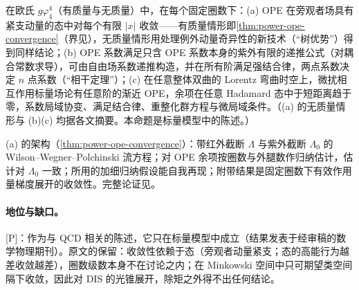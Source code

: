\begin{proposition}\label{prop:front-ope-scalar}
在欧氏 $g\varphi^4_4$（有质量与无质量）中，在每个固定圈数下：(a) OPE 在旁观者场具有紧支动量的态中对每个有限 $|x|$ 收敛——有质量情形即\cref{thm:power-ope-convergence}（界见\cite[式~(7)]{Hollands:2011gf}），无质量情形用处理例外动量奇异性的新技术（“树优势”）得到同样结论\cite{Holland:2014pna}；(b) OPE 系数满足只含 OPE 系数本身的紫外有限的递推公式（对耦合常数求导），可由自由场系数递推构造\cite{Holland:2014ifa}，并在所有阶满足强结合律，两点系数决定 $n$ 点系数（“相干定理”）\cite{Holland:2015tia}；(c) 在任意整体双曲的 Lorentz 弯曲时空上，微扰相互作用标量场论有任意阶的渐近 OPE，余项在任意 Hadamard 态中于短距离趋于零，系数局域协变、满足结合律、重整化群方程与微局域条件\cite{Hollands:2006ag}。（(a) 的无质量情形与 (b)(c) 均据各文摘要。本命题是标量模型中的陈述。）
\end{proposition}

\begin{proofsketch}
(a) 的架构（\cref{thm:power-ope-convergence}）：带红外截断 $\Lambda$ 与紫外截断 $\Lambda_0$ 的 Wilson--Wegner--Polchinski 流方程；对 OPE 余项按圈数与外腿数作归纳估计，估计对 $\Lambda_0$ 一致；所用的加细归纳假设能自我再现；附带结果是固定圈数下有效作用量梯度展开的收敛性。完整论证见\cite{Hollands:2011gf,Holland:2014pna}。
\end{proofsketch}

\paragraph{地位与缺口。}[P]：作为与 QCD 相关的陈述，它只在标量模型中成立（结果发表于经审稿的数学物理期刊）。原文的保留：收敛性依赖于态（旁观者动量紧支；态的高能行为越差收敛越差），圈数级数本身不在讨论之内；在 Minkowski 空间中只可期望类空间隔下收敛，因此对 DIS 的光锥展开，除矩之外得不出任何结论。

